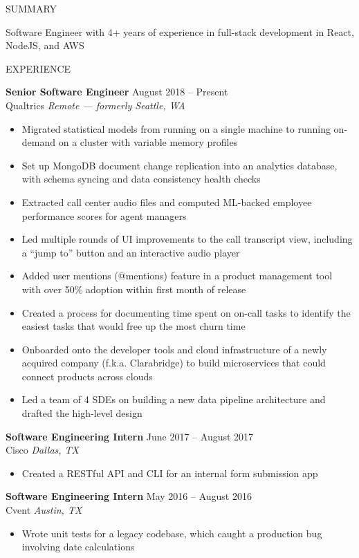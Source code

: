 \documentclass{resume} %
\begin{document}
\begin{rSection}{SUMMARY}

	{Software Engineer with 4+ years of experience in full-stack development in React, NodeJS, and AWS}

\end{rSection}


\begin{rSection}{EXPERIENCE}

	\textbf{Senior Software Engineer} \hfill August 2018 -- Present\\
	Qualtrics \hfill \textit{Remote --- formerly Seattle, WA}
	\begin{itemize}
		\itemsep -3pt {}
		\item Migrated statistical models from running on a single machine to running on-demand on a cluster with variable memory profiles
		\item Set up MongoDB document change replication into an analytics database, with schema syncing and data consistency health checks
		\item Extracted call center audio files and computed ML-backed employee performance scores for agent managers
		\item Led multiple rounds of UI improvements to the call transcript view, including a “jump to” button and an interactive audio player
		\item Added user mentions (@mentions) feature in a product management tool with over 50\% adoption within first month of release
		\item Created a process for documenting time spent on on-call tasks to identify the easiest tasks that would free up the most churn time
		\item Onboarded onto the developer tools and cloud infrastructure of a newly acquired company (f.k.a. Clarabridge) to build microservices that could connect products across clouds
		\item Led a team of 4 SDEs on building a new data pipeline architecture and drafted the high-level design
	\end{itemize}

	\textbf{Software Engineering Intern} \hfill June 2017 -- August 2017\\
	Cisco \hfill \textit{Dallas, TX}
	\begin{itemize}
		\item Created a RESTful API and CLI for an internal form submission app
	\end{itemize}

	\textbf{Software Engineering Intern} \hfill May 2016 -- August 2016\\
	Cvent \hfill \textit{Austin, TX}
	\begin{itemize}
		\item Wrote unit tests for a legacy codebase, which caught a production bug involving date calculations
	\end{itemize}

\end{rSection}
\end{document}
